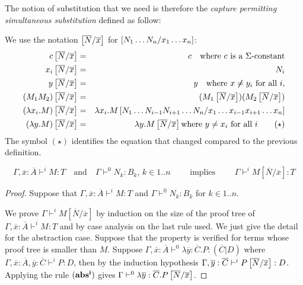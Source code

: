 The notion of substitution that we need is therefore the
\emph{capture permitting simultaneous substitution} defined as
follow:

\begin{dfn}
 We use the notation
$\left[ \overline{N}/\overline{x} \right]$ for $\left[ N_1 \ldots N_n/x_1
\ldots x_n \right]$:
\begin{eqnarray*}
c \left[ \overline{N}/\overline{x} \right] &=& c \quad \mbox{where $c$ is a $\Sigma$-constant}\\
 x_i \left[ \overline{N}/\overline{x} \right] &=& N_i\\
 y \left[ \overline{N}/\overline{x} \right] &=& y \quad \mbox{where } x \not \neq y_i \mbox{ for all } i,\\
(M_1 M_2) \left[ \overline{N}/\overline{x} \right] &=& (M_1 \left[ \overline{N}/\overline{x} \right]) (M_2 \left[ \overline{N}/\overline{x} \right])\\
(\lambda x_i . M) \left[ \overline{N}/\overline{x} \right] &=& \lambda x_i
. M
\left[ N_1 \ldots N_{i-1} N_{i+1}\ldots N_n/x_1 \ldots x_{i-1} x_{i+1}\ldots x_n \right] \\
(\lambda y . M) \left[ \overline{N}/\overline{x} \right] &=& \lambda y . M
\left[ \overline{N}/\overline{x} \right] \mbox{where $y \not = x_i$ for
all $i$} \qquad \mathbf{(\star)}
\end{eqnarray*}
The symbol $\mathbf{(\star)}$ identifies the equation that changed
compared to the previous definition.
\end{dfn}

\begin{lem}
$$ \Gamma,\overline{x} : \overline{A}\vdash^i M : T
\quad \mbox{and} \quad \Gamma \vdash^0 N_k : B_k \mbox{, } k \in
1..n \qquad \mbox{ implies } \qquad \Gamma \vdash^i
M[\overline{N}/\overline{x}] : T$$
\end{lem}

\begin{proof}
Suppose that $\Gamma,\overline{x}: \overline{A} \vdash^i M :T$ and
$\Gamma \vdash^0 N_k : B_k$ for $k \in 1..n$.

We prove $\Gamma \vdash^i M[\overline{N}/\overline{x}]$ by induction
on the size of the proof tree of $\Gamma,\overline{x}:\overline{A}
\vdash^i M : T$ and by case analysis on the last rule used. We just
give the detail for the abstraction case. Suppose that the property
is verified for terms whose proof tree is smaller than $M$. Suppose
$\Gamma,\overline{x}:\overline{A} \vdash^0 \lambda \overline{y} :
\overline{C}. P : (\overline{C}|D)$ where $\Gamma,
\overline{x}:\overline{A}, \overline{y}:\overline{C} \vdash^i P :
D$, then by the induction hypothesis $\Gamma,
\overline{y}:\overline{C} \vdash^i
P\left[ \overline{N}/\overline{x} \right] : D$. Applying the rule
$\mathbf{(abs^i)}$ gives $\Gamma \vdash^0 \lambda
\overline{y}:\overline{C} . P \left[ \overline{N}/\overline{x} \right]$.
\end{proof}

